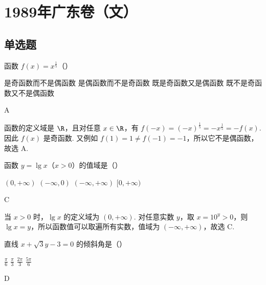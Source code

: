 \documentclass[UTF8,a4paper,oneside,11pt]{ctexbook}
\begin{document}
\mainmatter

\chapter{1989年广东卷（文）}

\section{单选题}

\begin{problem}
函数 \(f(x)=x^{\frac{1}{5}}\)（\quad）

\choices
    {是奇函数而不是偶函数}
    {是偶函数而不是奇函数}
    {既是奇函数又是偶函数}
    {既不是奇函数又不是偶函数}
\end{problem}

\begin{answer}
A
\end{answer}

\begin{solution}
函数的定义域是 \(\R\)，且对任意 \(x\in\R\)，有 \(f(-x)=(-x)^{\frac15}=-x^{\frac15}=-f(x)\). 因此 \(f(x)\) 是奇函数. 又例如 \(f(1)=1\neq f(-1)=-1\)，所以它不是偶函数，故选 A.
\end{solution}

\begin{problem}
函数 \(y=\lg x\)（\(x>0\)）的值域是（\quad）

\choices
    {\((0,+\infty)\)}
    {\((-\infty,0)\)}
    {\((-\infty,+\infty)\)}
    {\([0,+\infty)\)}
\end{problem}

\begin{answer}
C
\end{answer}

\begin{solution}
当 \(x>0\) 时，\(\lg x\) 的定义域为 \((0,+\infty)\). 对任意实数 \(y\)，取 \(x=10^y>0\)，则 \(\lg x=y\)，所以函数值可以取遍所有实数，值域为 \((-\infty,+\infty)\)，故选 C.
\end{solution}

\begin{problem}
直线 \(x+\sqrt{3}y-3=0\) 的倾斜角是（\quad）

\choices
    {\(\frac{\pi}{6}\)}
    {\(\frac{\pi}{3}\)}
    {\(\frac{2\pi}{3}\)}
    {\(\frac{5\pi}{6}\)}
\end{problem}

\begin{answer}
D
\end{answer}
\end{document}
